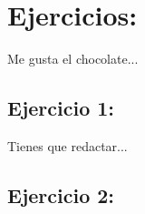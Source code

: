 \documentclass[11pt,onecolumn,a4paper,double]{article}
\begin{document}
    
\section{Ejercicios:}
Me gusta el chocolate...
\subsection{Ejercicio 1:}
Tienes que redactar...
\subsection{Ejercicio 2:}


\end{document}
